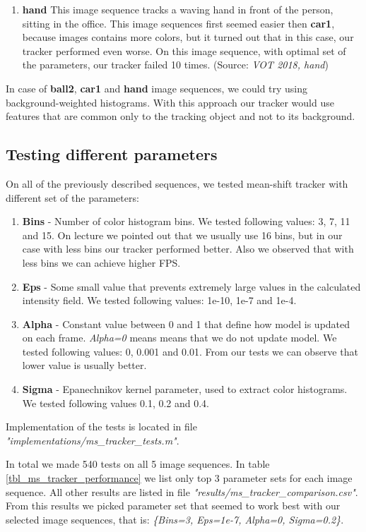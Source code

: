 \documentclass[runningheads]{llncs}
\begin{document}
\begin{enumerate}
\item \textbf{hand} This image sequence tracks a waving hand in front of the person, sitting in the office. This image sequences first seemed easier then \textbf{car1}, because images contains more colors, but it turned out that in this case, our tracker performed even worse. On this image sequence, with optimal set of the parameters, our tracker failed 10 times. (Source: \textit{VOT 2018, hand})
\end{enumerate}

In case of \textbf{ball2}, \textbf{car1} and \textbf{hand} image sequences, we could try using back\-ground-weighted histograms. With this approach our tracker would use features that are common only to the tracking object and not to its background.

\subsection{Testing different parameters}
\label{sec_ms_parameters}

On all of the previously described sequences, we tested mean-shift tracker with different set of the parameters:

\begin{enumerate}
    \item \textbf{Bins} - Number of color histogram bins. We tested following values: 3, 7, 11 and 15. On lecture we pointed out that we usually use 16 bins, but in our case with less bins our tracker performed better. Also we observed that with less bins we can achieve higher FPS.
    \item \textbf{Eps} - Some small value that prevents extremely large values in the calculated intensity field. We tested following values: 1e-10, 1e-7 and 1e-4.
    \item \textbf{Alpha} - Constant value between 0 and 1 that define how model is updated on each frame. \textit{Alpha=0} means means that we do not update model. We tested following values: 0, 0.001 and 0.01. From our tests we can observe that lower value is usually better.
    \item \textbf{Sigma} - Epanechnikov kernel parameter, used to extract color histograms. We tested following values 0.1, 0.2 and 0.4.
\end{enumerate}

Implementation of the tests is located in file \textit{"implementations/ms\_track\-er\_tests.m"}.

In total we made 540 tests on all 5 image sequences. In table \ref{tbl_ms_tracker_performance} we list only top 3 parameter sets for each image sequence. All other results are listed in file \textit{"results/ms\_tracker\_comparison.csv"}. From this results we picked parameter set that seemed to work best with our selected image sequences, that is: \textit{\{Bins=3, Eps=1e-7, Alpha=0, Sigma=0.2\}}.
\end{document}
